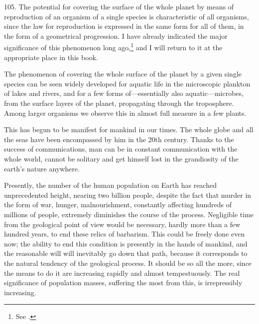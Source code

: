 105. The potential for covering the surface of the whole planet by means of
reproduction of an organism of a single species is characteristic of all
organisms, since the law for reproduction is expressed in the same form for
all of them, in the form of a geometrical progression.  I have already
indicated the major significance of this phenomenon long ago,\footnote{
	See \cites[37--38]{vernadsky1926biosfera}[335, 413--424]{vernadsky1994zhivoe}{vernadsky1926etudes1}[59--83]{vernadsky1940biogeohimicheskie}[75--101]{vernadsky1992trudy}.
} and I will return to it at the appropriate place in this book.

The phenomenon of covering the whole surface of the planet by a given single
species can be seen widely developed for aquatic life in the microscopic
plankton of lakes and rivers, and for a few forms of---essentially also
aquatic---microbes, from the surface layers of the planet, propagating through
the troposphere.  Among larger organisms we observe this in almost full
measure in a few plants.

This has begun to be manifest for mankind in our times.  The whole globe and
all the seas have been encompassed by him in the 20th century.  Thanks to the
success of communications, man can be in constant communication with the whole
world, cannot be solitary and get himself lost in the grandiosity of the
earth's nature anywhere.

Presently, the number of the human population on Earth has reached
unprecedented height, nearing two billion people, despite the fact that murder
in the form of war, hunger, malnourishment, constantly affecting hundreds of
millions of people, extremely diminishes the course of the process.
Negligible time from the geological point of view would be necessary, hardly
more than a few hundred years, to end these relics of barbarism.  This could
be freely done even now; the ability to end this condition is presently in the
hands of mankind, and the reasonable will will inevitably go down that path,
because it corresponds to the natural tendency of the geological process.  It
should be so all the more, since the means to do it are increasing rapidly and
almost tempestuously.  The real significance of population masses, suffering
the most from this, is irrepressibly increasing.

